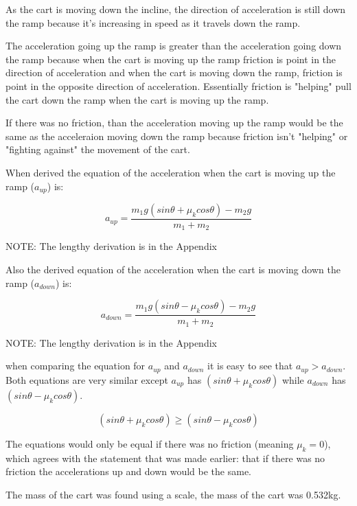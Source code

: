\documentclass[aps,letterpaper,11pt]{revtex4}
\begin{document}
As the cart is moving down the incline, the direction of acceleration is still down the ramp because it's increasing in speed as it travels down the ramp.

The acceleration going up the ramp is greater than the acceleration going down the ramp because when the cart is moving up the ramp friction is point in the direction of acceleration and when the cart is moving down the ramp, friction is point in the opposite direction of acceleration. Essentially friction is "helping" pull the cart down the ramp when the cart is moving up the ramp. 

If there was no friction, than the acceleration moving up the ramp would be the same as the acceleraion moving down the ramp because friction isn't "helping" or "fighting against" the movement of the cart. 

When derived the equation of the acceleration when the cart is moving up the ramp ($a_{up}$) is:

$$ a_{up}=\frac{m_1g(sin\theta+\mu_kcos\theta)-m_2g}{m_1+m_2}$$

\begin{center}
NOTE: The lengthy derivation is in the Appendix\\
\end{center}

Also the derived equation of the acceleration when the cart is moving down the ramp ($a_{down}$) is:

$$ a_{down}=\frac{m_1g(sin\theta-\mu_kcos\theta)-m_2g}{m_1+m_2}$$

\begin{center}
NOTE: The lengthy derivation is in the Appendix\\
\end{center}

when comparing the equation for $a_{up}$ and $a_{down}$ it is easy to see that $a_{up} > a_{down}$. Both equations are very similar except $a_{up}$ has $(sin\theta + \mu_kcos\theta)$ while $a_{down}$ has $(sin\theta - \mu_kcos\theta)$.

$$ (sin\theta + \mu_kcos\theta) \geq (sin\theta - \mu_kcos\theta)$$

The equations would only be equal if there was no friction (meaning $\mu_k = 0$), which agrees with the statement that was made earlier: that if there was no friction the accelerations up and down would be the same.

The mass of the cart was found using a scale, the mass of the cart was 0.532kg.
\end{document}
